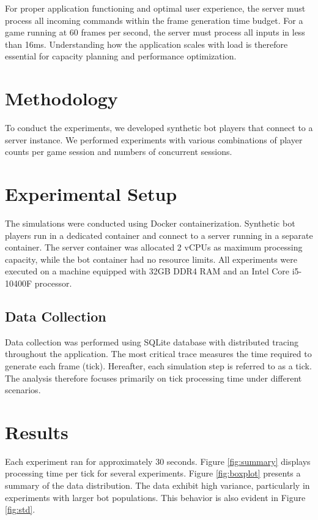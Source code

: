 \documentclass[acmsmall]{acmart}
\begin{document}
For proper application functioning and optimal user experience, the server must process all incoming commands within the frame generation time budget. For a game running at 60 frames per second, the server must process all inputs in less than 16ms. Understanding how the application scales with load is therefore essential for capacity planning and performance optimization.

\section{Methodology}

To conduct the experiments, we developed synthetic bot players that connect to a server instance. We performed experiments with various combinations of player counts per game session and numbers of concurrent sessions.

\section{Experimental Setup}

The simulations were conducted using Docker containerization. Synthetic bot players run in a dedicated container and connect to a server running in a separate container. The server container was allocated 2 vCPUs as maximum processing capacity, while the bot container had no resource limits. All experiments were executed on a machine equipped with 32GB DDR4 RAM and an Intel Core i5-10400F processor.

\subsection{Data Collection}

Data collection was performed using SQLite database with distributed tracing throughout the application. The most critical trace measures the time required to generate each frame (tick). Hereafter, each simulation step is referred to as a tick. The analysis therefore focuses primarily on tick processing time under different scenarios.

\section{Results}

Each experiment ran for approximately 30 seconds. Figure \ref{fig:summary} displays processing time per tick for several experiments. Figure \ref{fig:boxplot} presents a summary of the data distribution. The data exhibit high variance, particularly in experiments with larger bot populations. This behavior is also evident in Figure \ref{fig:std}.
\end{document}
